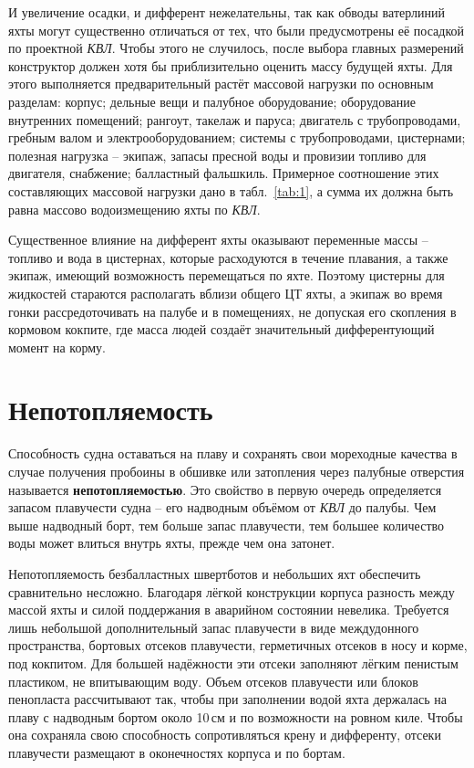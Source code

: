 И увеличение осадки, и дифферент нежелательны, так как обводы
ватерлиний яхты могут существенно отличаться от тех, что были
предусмотрены её посадкой по проектной \textit{КВЛ}. Чтобы этого не
случилось, после выбора главных размерений конструктор должен хотя бы
приблизительно оценить массу будущей яхты. Для этого выполняется
предварительный растёт массовой нагрузки по основным разделам: корпус;
дельные вещи и палубное оборудование; оборудование внутренних
помещений; рангоут, такелаж и паруса; двигатель с трубопроводами,
гребным валом и электрооборудованием; системы с трубопроводами,
цистернами; полезная нагрузка \--- экипаж, запасы пресной воды и
провизии топливо для двигателя, снабжение; балластный
фальшкиль. Примерное соотношение этих составляющих массовой нагрузки
дано в табл.~\ref{tab:1}, а сумма их должна быть равна массово
водоизмещению яхты по \textit{КВЛ}.

Существенное влияние на дифферент яхты оказывают переменные массы \---
топливо и вода в цистернах, которые расходуются в течение плавания, а
также экипаж, имеющий возможность перемещаться по яхте. Поэтому
цистерны для жидкостей стараются располагать вблизи общего ЦТ яхты, а
экипаж во время гонки рассредоточивать на палубе и в помещениях, не
допуская его скопления в кормовом кокпите, где масса людей создаёт
значительный дифферентующий момент на корму.

\section{Непотопляемость}

Способность судна оставаться на плаву и сохранять свои мореходные
качества в случае получения пробоины в обшивке или затопления через
палубные отверстия называется
\textbf{непотопляемостью}. Это свойство в
первую очередь определяется запасом плавучести судна \--- его
надводным объёмом от \textit{КВЛ} до палубы. Чем выше надводный борт,
тем больше запас плавучести, тем большее количество воды может влиться
внутрь яхты, прежде чем она затонет.

Непотопляемость безбалластных швертботов и небольших яхт обеспечить
сравнительно несложно. Благодаря лёгкой конструкции корпуса разность
между массой яхты и силой поддержания в аварийном состоянии
невелика. Требуется лишь небольшой дополнительный запас плавучести в
виде междудонного пространства, бортовых отсеков плавучести,
герметичных отсеков в носу и корме, под кокпитом. Для большей
надёжности эти отсеки заполняют лёгким пенистым пластиком, не
впитывающим воду. Объем отсеков плавучести или блоков пенопласта
рассчитывают так, чтобы при заполнении водой яхта держалась на плаву с
надводным бортом около 10\,см и по возможности на ровном киле. Чтобы
она сохраняла свою способность сопротивляться крену и дифференту,
отсеки плавучести размещают в оконечностях корпуса и по бортам.

